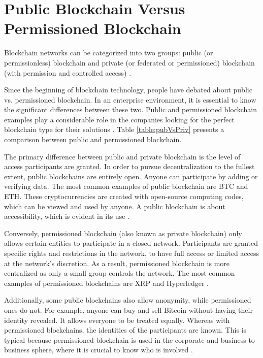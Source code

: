 \section{Public Blockchain Versus Permissioned Blockchain}\label{sec:versus}

Blockchain networks can be categorized into two groups: public (or permissionless) blockchain and private (or federated or permissioned) blockchain (with permission and controlled access) \cite{greve2018blockchain}.

Since the beginning of blockchain technology, people have debated about public vs. permissioned blockchain. In an enterprise environment, it is essential to know the significant differences between these two. Public and permissioned blockchain examples play a considerable role in the companies looking for the perfect blockchain type for their solutions \cite{101blockchains}. Table \ref{table:pubVsPriv} presents a comparison between public and permissioned blockchain.

The primary difference between public and private blockchain is the level of access participants are granted. In order to pursue decentralization to the fullest extent, public blockchains are entirely open. Anyone can participate by adding or verifying data. The most common examples of public blockchain are \ac{BTC} and \ac{ETH}. These cryptocurrencies are created with open-source computing codes, which can be viewed and used by anyone. A public blockchain is about accessibility, which is evident in its use \cite{selfkeyOrg}. 

Conversely, permissioned blockchain (also known as private blockchain) only allows certain entities to participate in a closed network. Participants are granted specific rights and restrictions in the network, to have full access or limited access at the network's discretion. As a result, permissioned blockchain is more centralized as only a small group controls the network. The most common examples of permissioned blockchains are \ac{XRP} and Hyperledger \cite{blockgeeks2018deeper}.

Additionally, some public blockchains also allow anonymity, while permissioned ones do not. For example, anyone can buy and sell Bitcoin without having their identity revealed. It allows everyone to be treated equally. Whereas with permissioned blockchains, the identities of the participants are known. This is typical because permissioned blockchain is used in the corporate and business-to-business sphere, where it is crucial to know who is involved \cite{101blockchains}.

